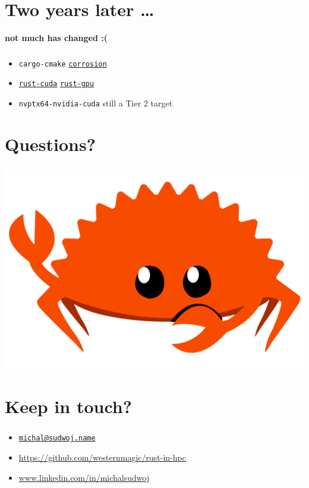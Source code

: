 \documentclass[aspectratio=43, t]{beamer}
\begin{document}
\section*{Two years later …}
\begin{frame}[c]
	\centering
	\textbf{\Large \secname}
\end{frame}

\begin{frame}[c]
	\centering
	\textbf{\Large not much has changed :(}
\end{frame}

\begin{frame}
	\frametitle{\secname}
	\begin{itemize}
		\item \texttt{cargo-cmake} \textrightarrow{} \href{https://github.com/corrosion-rs/corrosion}{\texttt{corrosion}}
		\item \href{https://github.com/rust-cuda}{\texttt{rust-cuda}} \textrightarrow{} \href{https://github.com/Rust-GPU/}{\texttt{rust-gpu}}
		\item \texttt{nvptx64-nvidia-cuda} still a Tier 2 target
	\end{itemize}
\end{frame}

\section*{Questions?}
\begin{frame}
	\frametitle{\secname}
	\includegraphics[width = \textwidth, height = \textheight, keepaspectratio]{rustacean-flat-gesture.png}
\end{frame}

\section*{Keep in touch?}
\begin{frame}
	\frametitle{\secname}

	\begin{itemize}
		\item \href{mailto:michal@sudwoj.name}{\texttt{michal@sudwoj.name}}
		\item \url{https://github.com/westernmagic/rust-in-hpc}
		\item \url{www.linkedin.com/in/michalsudwoj}
	\end{itemize}
\end{frame}

\end{document}
